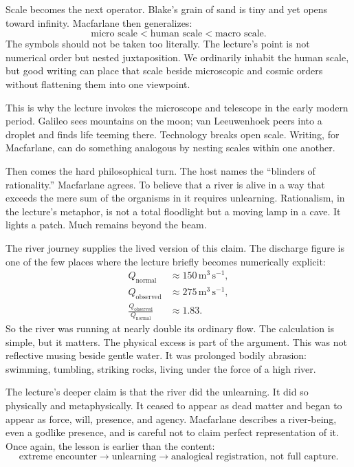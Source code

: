 Scale becomes the next operator. Blake's grain of sand is tiny and yet opens toward infinity. Macfarlane then generalizes:
\begin{equation}
\text{micro scale} < \text{human scale} < \text{macro scale}.
\end{equation}
The symbols should not be taken too literally. The lecture's point is not numerical order but nested juxtaposition. We ordinarily inhabit the human scale, but good writing can place that scale beside microscopic and cosmic orders without flattening them into one viewpoint.

This is why the lecture invokes the microscope and telescope in the early modern period. Galileo sees mountains on the moon; van Leeuwenhoek peers into a droplet and finds life teeming there. Technology breaks open scale. Writing, for Macfarlane, can do something analogous by nesting scales within one another.

Then comes the hard philosophical turn. The host names the ``blinders of rationality.'' Macfarlane agrees. To believe that a river is alive in a way that exceeds the mere sum of the organisms in it requires unlearning. Rationalism, in the lecture's metaphor, is not a total floodlight but a moving lamp in a cave. It lights a patch. Much remains beyond the beam.

The river journey supplies the lived version of this claim. The discharge figure is one of the few places where the lecture briefly becomes numerically explicit:
\begin{align}
Q_{\text{normal}} &\approx 150\,\mathrm{m^3\,s^{-1}},\\
Q_{\text{observed}} &\approx 275\,\mathrm{m^3\,s^{-1}},\\
\frac{Q_{\text{observed}}}{Q_{\text{normal}}} &\approx 1.83.
\end{align}
So the river was running at nearly double its ordinary flow. The calculation is simple, but it matters. The physical excess is part of the argument. This was not reflective musing beside gentle water. It was prolonged bodily abrasion: swimming, tumbling, striking rocks, living under the force of a high river.

The lecture's deeper claim is that the river did the unlearning. It did so physically and metaphysically. It ceased to appear as dead matter and began to appear as force, will, presence, and agency. Macfarlane describes a river-being, even a godlike presence, and is careful not to claim perfect representation of it. Once again, the lesson is earlier than the content:
\begin{equation}
\text{extreme encounter} \longrightarrow \text{unlearning} \longrightarrow \text{analogical registration, not full capture}.
\end{equation}

